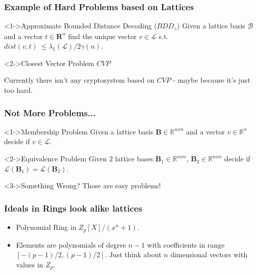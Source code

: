 \documentclass{beamer}
\begin{document}
\begin{frame}
    \frametitle{Example of Hard Problems based on Lattices}

    \begin{block}<1->{Approximate Bounded Distance Decoding ($BDD_{\gamma}$)}
        Given a lattice basis $\mathcal{B}$ and a vector $t \in \mathbf{R}^n$ find the unique vector $v \in \mathcal{L}$ s.t. $dist(v, t) \ \leq \lambda_1(\mathcal{L}) / 2 \gamma(n)$.
    \end{block}

    \begin{block}<2->{Closest Vector Problem $CVP$}   

    \pause Currently there isn't any cryptosystem based on $CVP$ - maybe because it's just too hard.
    \end{block} 
\end{frame}

\begin{frame}
    \frametitle{Not More Problems...}

    \begin{block}<1->{Membership Problem}
        Given a lattice basis $\mathbf{B} \in \mathbb{R}^{nxn}$ and a vector $v \in \mathbb{R}^n$ decide if $v \in \mathcal{L}$.
    \end{block}

    \begin{block}<2->{Equivalence Problem}
        Given $2$ lattice bases $\mathbf{B}_1 \in \mathbb{R}^{nxn}$, $\mathbf{B}_2 \in \mathbb{R}^{nxn}$ decide if $\mathcal{L}(\mathbf{B}_1) = \mathcal{L}(\mathbf{B}_2)$.
    \end{block}

    \begin{block}<3->{Something Wrong?}
        \pause \pause \pause Those are easy problems!
    \end{block}
\end{frame}

\begin{frame}
    \frametitle{Ideals in Rings look alike lattices}
    \begin{itemize}
        \item Polynomial Ring in $Z_p[X] / (x ^ n + 1)$.
        \pause \item Elements are polynomials of degree $n - 1$ with coefficients in range $[-(p-1)/2, (p-1)/2]$. Just think about $n$ dimensional vectors with values in $Z_p$.
    \end{itemize}
\end{frame}
\end{document}

